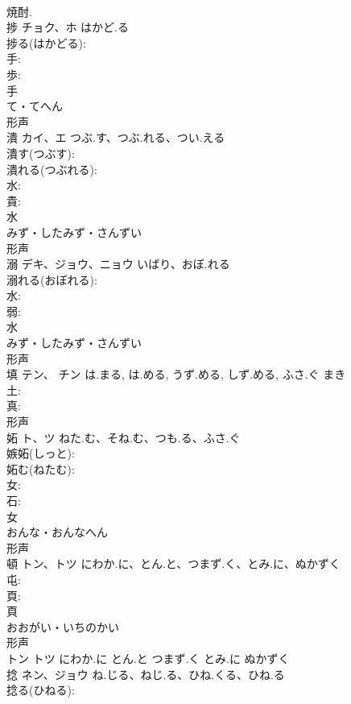 \documentclass[8pt]{extreport}
\begin{document}
\begin{CJK}{UTF8}{min}
\\	焼酎. 
\\	捗	チョク、ホ	はかど.る		
\\	捗る(はかどる): 
\\	手: 
\\	歩: 
\\	手	
\\	て・てへん	
\\	形声 
\\	潰	カイ、エ	つぶ.す、つぶ.れる、つい.える		
\\	潰す(つぶす): 
\\	潰れる(つぶれる): 
\\	水: 
\\	貴: 
\\	水	
\\	みず・したみず・さんずい	
\\	形声 
\\	溺	デキ、ジョウ、ニョウ	いばり、おぼ.れる		
\\	溺れる(おぼれる): 
\\	水: 
\\	弱: 
\\	水	
\\	みず・したみず・さんずい	
\\	形声 
\\	填	テン、 チン	は.まる, は.める, うず.める, しず.める, ふさ.ぐ	まき	
\\	土: 
\\	真: 
\\	形声 
\\	妬	ト、ツ	ねた.む、そね.む、つも.る、ふさ.ぐ		
\\	嫉妬(しっと): 
\\	妬む(ねたむ): 
\\	女: 
\\	石: 
\\	女	
\\	おんな・おんなへん	
\\	形声 
\\	頓	トン、トツ	にわか.に、とん.と、つまず.く、とみ.に、ぬかずく		
\\	屯: 
\\	頁: 
\\	頁	
\\	おおがい・いちのかい	
\\	形声 
\\	トン トツ にわか.に とん.と つまず.く とみ.に ぬかずく 
\\	捻	ネン、ジョウ	ね.じる、ねじ.る、ひね.くる、ひね.る		
\\	捻る(ひねる): 

\end{CJK}
\end{document}
